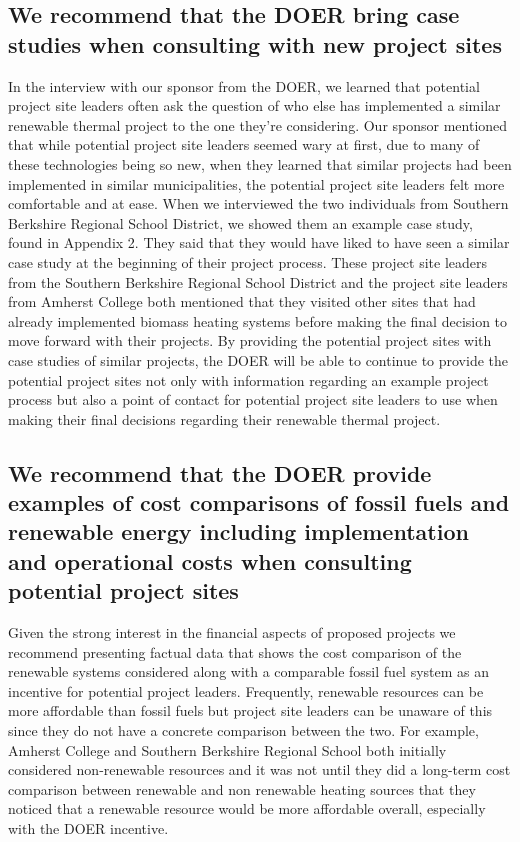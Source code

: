 \subsection{We recommend that the DOER bring case studies when consulting with new project sites}
\par In the interview with our sponsor from the DOER, we learned that potential project site leaders often ask the question of who else has implemented a similar renewable thermal project to the one they’re considering. Our sponsor mentioned that while potential project site leaders seemed wary at first, due to many of these technologies being so new, when they learned that similar projects had been implemented in similar municipalities, the potential project site leaders felt more comfortable and at ease. When we interviewed the two individuals from Southern Berkshire Regional School District, we showed them an example case study, found in Appendix 2. They said that they would have liked to have seen a similar case study at the beginning of their project process. These project site leaders from the Southern Berkshire Regional School District and the project site leaders from Amherst College both mentioned that they visited other sites that had already implemented biomass heating systems before making the final decision to move forward with their projects. By providing the potential project sites with case studies of similar projects, the DOER will be able to continue to provide the potential project sites not only with information regarding an example project process but also a point of contact for potential project site leaders to use when making their final decisions regarding their renewable thermal project.

\subsection{We recommend that the DOER provide examples of cost comparisons of fossil fuels and renewable energy including implementation and operational costs when consulting potential project sites}
\par Given the strong interest in the financial aspects of proposed projects we recommend presenting factual data that shows the cost comparison of the renewable systems considered along with a comparable fossil fuel system as an incentive for potential project leaders. Frequently, renewable resources can be more affordable than fossil fuels but project site leaders can be unaware of this since they do not have a concrete comparison between the two. For example, Amherst College and Southern Berkshire Regional School both initially considered non-renewable resources and it was not until they did a long-term cost comparison between renewable and non renewable heating sources that they noticed that a renewable resource would be more affordable overall, especially with the DOER incentive. 

